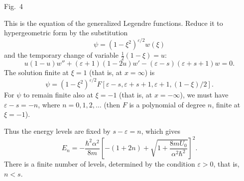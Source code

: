 \begin{center}

\small Fig.~4
\end{center}

This is the equation of the generalized Legendre functions. Reduce it to
hypergeometric form by the substitution
\[
  \psi=(1-\xi^2)^{\varepsilon/2}w(\xi)
\]
and the temporary change of variable $\tfrac12(1-\xi)=u$:
\[
  u(1-u)w''+(\varepsilon+1)(1-2u)w'
  -(\varepsilon-s)(\varepsilon+s+1)w=0.
\]
The solution finite at $\xi=1$ (that is, at $x=\infty$) is
\[
  \psi=(1-\xi^2)^{\varepsilon/2}
  F[\varepsilon-s,\varepsilon+s+1,\varepsilon+1,(1-\xi)/2].
\]
For $\psi$ to remain finite also at $\xi=-1$ (that is, at $x=-\infty$), we
must have $\varepsilon-s=-n$, where $n=0,1,2,\ldots$ (then $F$ is a
polynomial of degree $n$, finite at $\xi=-1$).

Thus the energy levels are fixed by $s-\varepsilon=n$, which gives
\[
  E_n=-\frac{\hbar^2\alpha^2}{8m}
  \left[-(1+2n)+\sqrt{1+\frac{8mU_0}{\alpha^2\hbar^2}}\right]^2.
\]
There is a finite number of levels, determined by the condition
$\varepsilon>0$, that is, $n<s$.
